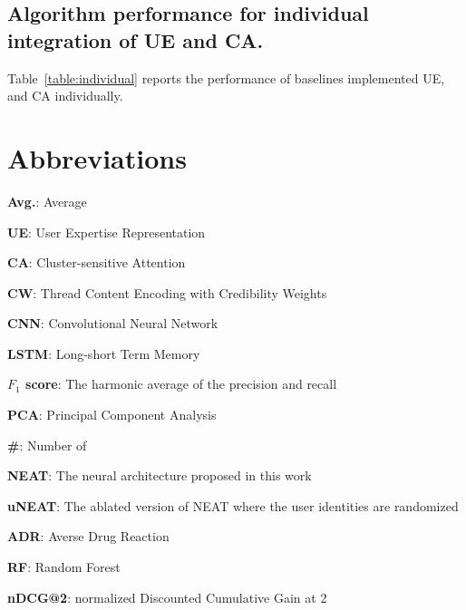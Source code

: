 \documentclass{bmcart}
\begin{document}
\subsection{Algorithm performance for individual integration of UE and CA.}\label{appendix:ue_ca}
Table~\ref{table:individual} reports the performance of baselines implemented UE, and CA individually.

\section*{Abbreviations}
\begin{flushleft}
\textbf{Avg.}: Average

\textbf{UE}: User Expertise Representation

\textbf{CA}: Cluster-sensitive Attention

\textbf{CW}: Thread Content Encoding with Credibility Weights

\textbf{CNN}: Convolutional Neural Network

\textbf{LSTM}: Long-short Term Memory

\textbf{$F_1$ score}: The harmonic average of the precision and recall

\textbf{PCA}: Principal Component Analysis

\textbf{\#}: Number of

\textbf{NEAT}: The neural architecture proposed in this work

\textbf{uNEAT}: The ablated version of NEAT where the  user identities are randomized

\textbf{ADR}: Averse Drug Reaction

\textbf{RF}: Random Forest

\textbf{nDCG@2}: normalized Discounted Cumulative Gain at 2

\end{flushleft}




\end{document}
